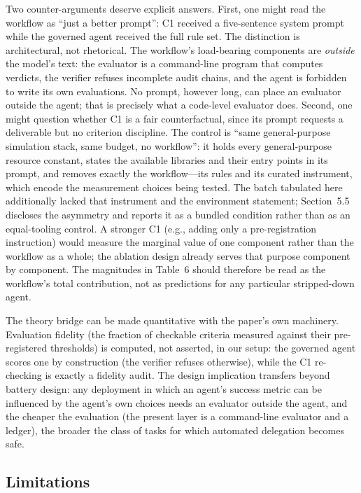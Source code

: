 Two counter-arguments deserve explicit answers. First, one might read the
workflow as ``just a better prompt'': C1 received a five-sentence system
prompt while the governed agent received the full rule set. The distinction
is architectural, not rhetorical. The workflow's load-bearing components
are \emph{outside} the model's text: the evaluator is a
command-line program that computes verdicts, the verifier refuses
incomplete audit chains, and the agent is forbidden to write its own
evaluations. No prompt, however long, can place an evaluator outside the
agent; that is precisely what a code-level evaluator does. Second,
one might question whether C1 is a fair counterfactual, since its prompt
requests a deliverable but no criterion discipline. The control is
``same general-purpose simulation stack, same budget, no workflow'': it holds
every general-purpose resource constant, states the available libraries and
their entry points in its prompt, and removes exactly the workflow---its
rules and its curated instrument, which encode the measurement choices being
tested. The batch tabulated here additionally lacked that instrument and the
environment statement; Section~5.5 discloses the asymmetry and reports it as
a bundled condition rather than as an equal-tooling control. A stronger C1
(e.g., adding only a
pre-registration instruction) would measure the marginal value of one
component rather than the workflow as a whole; the ablation design already
serves that purpose component by component. The magnitudes in Table~6
should therefore be read as the workflow's total contribution, not as
predictions for any particular stripped-down agent.

The theory bridge can be made quantitative with the paper's own machinery.
Evaluation fidelity (the fraction of checkable criteria measured against
their pre-registered thresholds) is computed, not asserted, in our setup:
the governed agent scores one by construction (the verifier refuses
otherwise), while the C1 re-checking is exactly a fidelity audit. The
design implication transfers beyond battery design: any deployment in which
an agent's success metric can be influenced by the agent's own choices
needs an evaluator outside the agent, and the cheaper the
evaluation (the present layer is a command-line evaluator and a ledger),
the broader the class of tasks for which automated delegation becomes
safe.

\subsection{Limitations}

